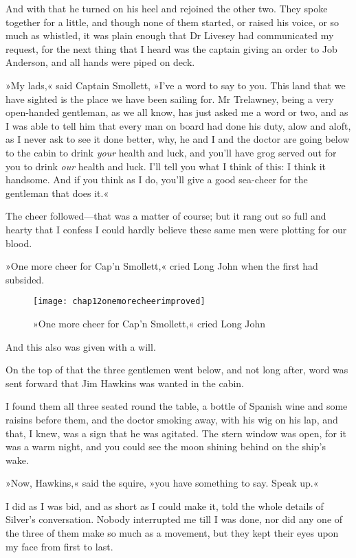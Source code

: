 And with that he turned on his heel and rejoined the other two. They spoke together for a little, and though none of them started, or raised his voice, or so much as whistled, it was plain enough that Dr Livesey had communicated my request, for the next thing that I heard was the captain giving an order to Job Anderson, and all hands were piped on deck.

»My lads,« said Captain Smollett, »I've a word to say to you. This land that we have sighted is the place we have been sailing for. Mr Trelawney, being a very open-handed gentleman, as we all know, has just asked me a word or two, and as I was able to tell him that every man on board had done his duty, alow and aloft, as I never ask to see it done better, why, he and I and the doctor are going below to the cabin to drink \textit{your} health and luck, and you'll have grog served out for you to drink \textit{our} health and luck. I'll tell you what I think of this: I think it handsome. And if you think as I do, you'll give a good sea-cheer for the gentleman that does it.«

The cheer followed—that was a matter of course; but it rang out so full and hearty that I confess I could hardly believe these same men were plotting for our blood.

»One more cheer for Cap'n Smollett,« cried Long John when the first had subsided.

 \begin{sidewaysfigure}
\texttt{[image: chap12onemorecheerimproved]}%
\caption{»One more cheer for Cap'n Smollett,« cried Long John}
\end{sidewaysfigure} 

And this also was given with a will.

On the top of that the three gentlemen went below, and not long after, word was sent forward that Jim Hawkins was wanted in the cabin.

I found them all three seated round the table, a bottle of Spanish wine and some raisins before them, and the doctor smoking away, with his wig on his lap, and that, I knew, was a sign that he was agitated. The stern window was open, for it was a warm night, and you could see the moon shining behind on the ship's wake.

»Now, Hawkins,« said the squire, »you have something to say. Speak up.«

I did as I was bid, and as short as I could make it, told the whole details of Silver's conversation. Nobody interrupted me till I was done, nor did any one of the three of them make so much as a movement, but they kept their eyes upon my face from first to last.

